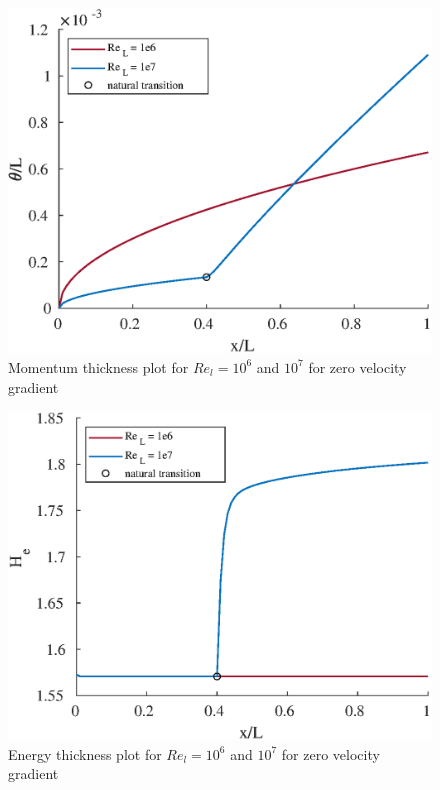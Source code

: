 

\pagebreak



\begin{figure}[H]
\centering
\includegraphics[scale=0.8]{graphs/e6g1.eps}
\caption{Momentum thickness plot for $Re_l = 10^6$ and $10^7$ for zero velocity gradient}
\label{e6g1}
\end{figure}

\begin{figure}[H]
\centering
\includegraphics[scale=0.8]{graphs/e6g2.eps}
\caption{Energy thickness plot for $Re_l = 10^6$ and $10^7$ for zero velocity gradient}
\label{e6g2}
\end{figure}

